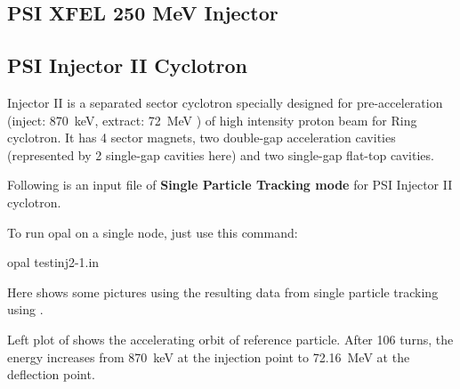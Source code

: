 \subsection{PSI XFEL 250 MeV Injector}
\label{sec:felinj}



\subsection{PSI  Injector II Cyclotron}
\label{sec:inj2}
Injector II is a separated sector cyclotron specially designed for pre-acceleration (inject: \SI{870}{\kilo\electronvolt}, extract: \SI{72}{\mega\electronvolt} )
of high intensity proton beam for Ring cyclotron. It has 4 sector magnets, two double-gap acceleration cavities
(represented by 2 single-gap cavities here) and two single-gap flat-top cavities.

Following is an input file of {\bfseries Single Particle Tracking mode} for PSI Injector II cyclotron.


To run opal on a single node, just use this command:
\begin{example}
 opal testinj2-1.in
\end{example}

Here shows some pictures using the resulting data from single particle tracking using \opalcycl.

Left plot of  shows the accelerating orbit of reference particle. After 106 turns, the energy increases from \SI{870}{\kilo\electronvolt} at the injection point to \SI{72.16}{\mega\electronvolt} at the deflection point.

